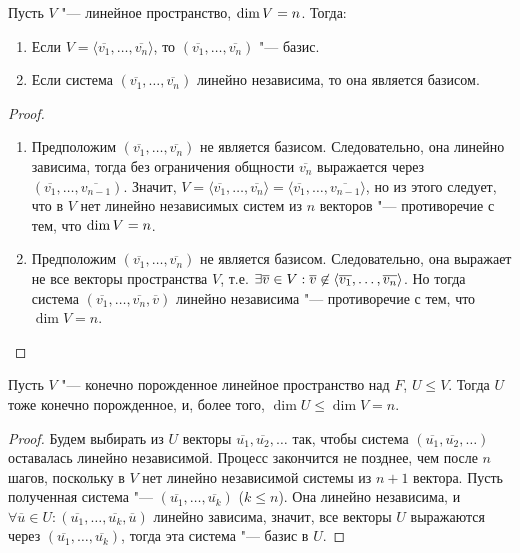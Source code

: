 \begin{proposition}
	Пусть $V$ "--- линейное пространство, $\dim{V} \hm{=} n$. Тогда:
	\begin{enumerate}
		\item Если $V = \langle\overline{v_1}, \dots, \overline{v_n}\rangle$, то $(\overline{v_1}, \dots, \overline{v_n})$ "--- базис.
		\item Если система $(\overline{v_1}, \dots, \overline{v_n})$ линейно независима, то она является базисом.
	\end{enumerate}
\end{proposition}

\begin{proof}~
	\begin{enumerate}
		\item Предположим $(\overline{v_1}, \dots, \overline{v_n})$ не является базисом. Следовательно, она линейно зависима, тогда без ограничения общности $\overline{v_n}$ выражается через $(\overline{v_1}, \dots, \overline{v_{n - 1}})$. Значит, $V = \langle\overline{v_1}, \dots, \overline{v_n}\rangle = \langle\overline{v_1}, \dots, \overline{v_{n - 1}}\rangle$, но из этого следует, что в $V$ нет линейно независимых систем из $n$ векторов "--- противоречие с тем, что $\dim{V} \hm{=} n$.
		\item Предположим $(\overline{v_1}, \dots, \overline{v_n})$ не является базисом. Следовательно, она выражает не все векторы пространства $V$, т.\:е. $\exists \overline{v} \hm{\in} V: \overline{v} \not\in \langle\overline{v_1}, \dots, \overline{v_n}\rangle$. Но тогда система $(\overline{v_1},\dots,\overline{v_n},\overline{v})$ линейно независима "--- противоречие с тем, что $\dim{V} = n$.
	\end{enumerate}
\end{proof}

\begin{proposition}
	Пусть $V$ "--- конечно порожденное линейное пространство над $F$, $U \le V$. Тогда $U$ тоже конечно порожденное, и, более того, $\dim{U} \le \dim{V} = n$.
\end{proposition}

\begin{proof}
	Будем выбирать из $U$ векторы $\overline{u_1}, \overline{u_2}, \dots$ так, чтобы система $(\overline{u_1}, \overline{u_2}, \dots)$ оставалась линейно независимой. Процесс закончится не позднее, чем после $n$ шагов, поскольку в $V$ нет линейно независимой системы из $n + 1$ вектора. Пусть полученная система "--- $(\overline{u_1}, \dots, \overline{u_k})$ ($k \le n$). Она линейно независима, и $\forall \overline{u} \in U: (\overline{u_1}, \dots, \overline{u_k}, \overline{u})$ линейно зависима, значит, все векторы $U$ выражаются через $(\overline{u_1}, \dots, \overline{u_k})$, тогда эта система "--- базис в $U$.
\end{proof}

